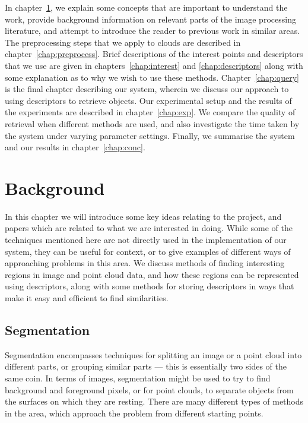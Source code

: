 \documentclass[11pt,a4paper]{kth-mag}
\begin{document}
In chapter~\ref{chap:bg}, we explain some concepts that are important to
understand the work, provide background information on relevant parts of the
image processing literature, and attempt to introduce the reader to previous
work in similar areas. The preprocessing steps that we apply to clouds are
described in chapter~\ref{chap:preprocess}. Brief descriptions of the interest
points and descriptors that we use are given in chapters~\ref{chap:interest} and
\ref{chap:descriptors} along with some explanation as to why we wish to use
these methods. Chapter~\ref{chap:query} is the final chapter describing our
system, wherein we discuss our approach to using descriptors to retrieve
objects. Our experimental setup and the results of the experiments are described
in chapter~\ref{chap:exp}. We compare the quality of retrieval when different
methods are used, and also investigate the time taken by the system under
varying parameter settings. Finally, we summarise the system and our results in
chapter~\ref{chap:conc}.
\chapter{Background}
\label{chap:bg}
In this chapter we will introduce some key ideas relating to the project, and
papers which are related to what we are interested in doing. While some of the
techniques mentioned here are not directly used in the implementation of our
system, they can be useful for context, or to give examples of different ways of
approaching problems in this area. We discuss methods of finding interesting
regions in image and point cloud data, and how these regions can be represented
using descriptors, along with some methods for storing descriptors in ways that
make it easy and efficient to find similarities.

\section{Segmentation}
Segmentation encompasses techniques for splitting an image or a point cloud into
different parts, or grouping similar parts --- this is essentially two sides of
the same coin. In terms of images, segmentation might be used to try to find
background and foreground pixels, or for point clouds, to separate objects from
the surfaces on which they are resting. There are many different types of
methods in the area, which approach the problem from different starting points.
\end{document}
